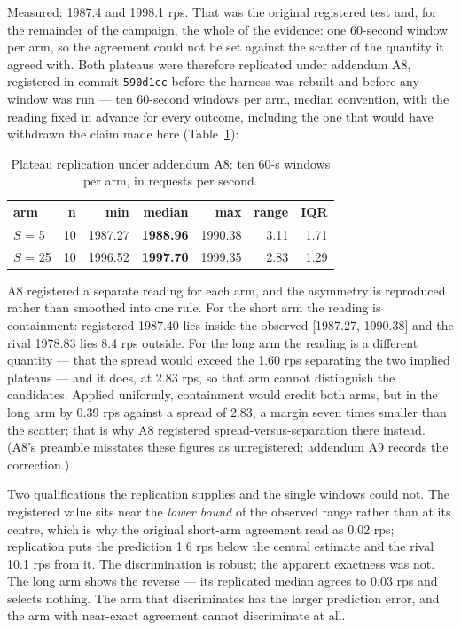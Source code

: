 \documentclass{ieeeaccess}
\begin{document}
Measured: 1987.4 and 1998.1 rps. That was the original registered test and, for the remainder of the campaign, the whole of the evidence: one 60-second window per arm, so the agreement could not be set against the scatter of the quantity it agreed with. Both plateaus were therefore replicated under addendum A8, registered in commit \texttt{590d1cc} before the harness was rebuilt and before any window was run --- ten 60-second windows per arm, median convention, with the reading fixed in advance for every outcome, including the one that would have withdrawn the claim made here (Table~\ref{tab:a8-replication}):

\begin{table}[!t]
\caption[Plateau replication under addendum A8: ten 60-s windows per arm, in requests per second.]{Plateau replication under addendum A8: ten 60-s windows per arm, in requests per second.}
\label{tab:a8-replication}
\centering
\footnotesize
\begin{tabular}{lrrrrrr}
\hline
{\bfseries arm} & {\bfseries n} & {\bfseries min} & {\bfseries median} & {\bfseries max} & {\bfseries range} & {\bfseries IQR} \\ \hline
$S$ = 5 & 10 & 1987.27 & {\bfseries 1988.96} & 1990.38 & 3.11 & 1.71 \\
$S$ = 25 & 10 & 1996.52 & {\bfseries 1997.70} & 1999.35 & 2.83 & 1.29 \\
\hline
\end{tabular}
\end{table}

A8 registered a separate reading for each arm, and the asymmetry is reproduced rather than smoothed into one rule. For the short arm the reading is containment: registered 1987.40 lies inside the observed [1987.27, 1990.38] and the rival 1978.83 lies 8.4 rps outside. For the long arm the reading is a different quantity --- that the spread would exceed the 1.60 rps separating the two implied plateaus --- and it does, at 2.83 rps, so that arm cannot distinguish the candidates. Applied uniformly, containment would credit both arms, but in the long arm by 0.39 rps against a spread of 2.83, a margin seven times smaller than the scatter; that is why A8 registered spread-versus-separation there instead. (A8's preamble misstates these figures as unregistered; addendum A9 records the correction.)

Two qualifications the replication supplies and the single windows could not. The registered value sits near the \textit{lower bound} of the observed range rather than at its centre, which is why the original short-arm agreement read as 0.02 rps; replication puts the prediction 1.6 rps below the central estimate and the rival 10.1 rps from it. The discrimination is robust; the apparent exactness was not. The long arm shows the reverse --- its replicated median agrees to 0.03 rps and selects nothing. The arm that discriminates has the larger prediction error, and the arm with near-exact agreement cannot discriminate at all.
\end{document}
